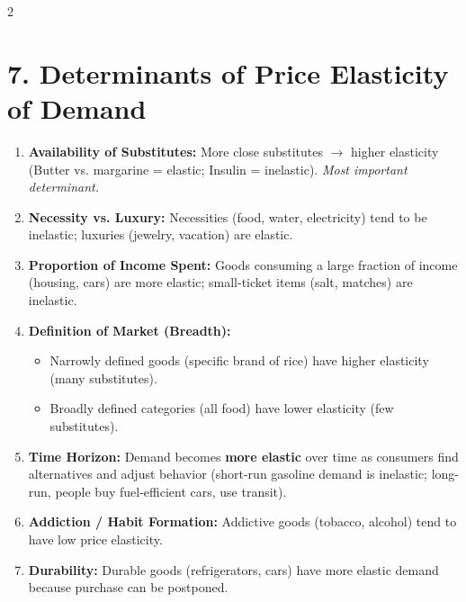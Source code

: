 \documentclass[10pt,a4paper]{article}
\begin{document}
\begin{multicols}{2}
\section*{7. Determinants of Price Elasticity of Demand}

\begin{enumerate}[leftmargin=*,nosep]
    \item \textbf{Availability of Substitutes:} More close substitutes $\to$ higher elasticity (Butter vs. margarine = elastic; Insulin = inelastic). \textit{Most important determinant.}
    \item \textbf{Necessity vs. Luxury:} Necessities (food, water, electricity) tend to be inelastic; luxuries (jewelry, vacation) are elastic.
    \item \textbf{Proportion of Income Spent:} Goods consuming a large fraction of income (housing, cars) are more elastic; small-ticket items (salt, matches) are inelastic.
    \item \textbf{Definition of Market (Breadth):}
    \begin{itemize}[nosep]
        \item Narrowly defined goods (specific brand of rice) have higher elasticity (many substitutes).
        \item Broadly defined categories (all food) have lower elasticity (few substitutes).
    \end{itemize}
    \item \textbf{Time Horizon:} Demand becomes \textbf{more elastic} over time as consumers find alternatives and adjust behavior (short-run gasoline demand is inelastic; long-run, people buy fuel-efficient cars, use transit).
    \item \textbf{Addiction / Habit Formation:} Addictive goods (tobacco, alcohol) tend to have low price elasticity.
    \item \textbf{Durability:} Durable goods (refrigerators, cars) have more elastic demand because purchase can be postponed.
\end{enumerate}


\end{multicols}
\end{document}
